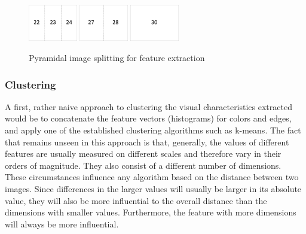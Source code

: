 \begin{figure}[h]
\includegraphics[width=0.19\textwidth]{images/partitioning3v.pdf}
\includegraphics[width=0.19\textwidth]{images/partitioning2v.pdf}
\includegraphics[width=0.19\textwidth]{images/partitioning1v.pdf}
\caption{Pyramidal image splitting for feature extraction}
\label{fig_partitioning}
\end{figure}


\subsubsection{Clustering}
A first, rather naive approach to clustering the visual characteristics extracted would be to concatenate the feature vectors (histograms) for colors and edges, and apply one of the established clustering algorithms such as k-means. The fact that remains unseen in this approach is that, generally, the values of different features are usually measured on different scales and therefore vary in their orders of magnitude. They also consist of a different number of dimensions. \\
These circumstances influence any algorithm based on the distance between two images. Since differences in the larger values will usually be larger in its absolute value, they will also be more influential to the overall distance than the dimensions with smaller values. Furthermore, the feature with more dimensions will always be more influential.


